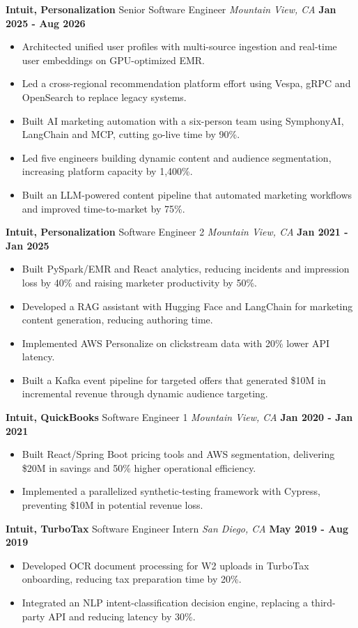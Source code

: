 \documentclass[10pt, letterpaper]{article}
\newcommand{\jobentry}[4]{
  \noindent\textbf{#1} \hfill #2 \hfill \textit{#3} \hfill \textbf{#4}
}
\begin{document}
\jobentry{Intuit, Personalization}{Senior Software Engineer}{Mountain View, CA}{Jan 2025 - Aug 2026}
\begin{itemize}
	\item Architected unified user profiles with multi-source ingestion and real-time user embeddings on GPU-optimized EMR.
	\item Led a cross-regional recommendation platform effort using Vespa, gRPC and OpenSearch to replace legacy systems.
	\item Built AI marketing automation with a six-person team using SymphonyAI, LangChain and MCP, cutting go-live time by 90\%.
	\item Led five engineers building dynamic content and audience segmentation, increasing platform capacity by 1,400\%.
	\item Built an LLM-powered content pipeline that automated marketing workflows and improved time-to-market by 75\%.
\end{itemize}

\jobentry{Intuit, Personalization}{Software Engineer 2}{Mountain View, CA}{Jan 2021 - Jan 2025}
\begin{itemize}
	\item Built PySpark/EMR and React analytics, reducing incidents and impression loss by 40\% and raising marketer productivity by 50\%.
	\item Developed a RAG assistant with Hugging Face and LangChain for marketing content generation, reducing authoring time.
	\item Implemented AWS Personalize on clickstream data with 20\% lower API latency.
	\item Built a Kafka event pipeline for targeted offers that generated \$10M in incremental revenue through dynamic audience targeting.
\end{itemize}

\jobentry{Intuit, QuickBooks}{Software Engineer 1}{Mountain View, CA}{Jan 2020 - Jan 2021}
\begin{itemize}
	\item Built React/Spring Boot pricing tools and AWS segmentation, delivering \$20M in savings and 50\% higher operational efficiency.
	\item Implemented a parallelized synthetic-testing framework with Cypress, preventing \$10M in potential revenue loss.
\end{itemize}

\jobentry{Intuit, TurboTax}{Software Engineer Intern}{San Diego, CA}{May 2019 - Aug 2019}
\begin{itemize}
	\item Developed OCR document processing for W2 uploads in TurboTax onboarding, reducing tax preparation time by 20\%.
	\item Integrated an NLP intent-classification decision engine, replacing a third-party API and reducing latency by 30\%.
\end{itemize}
\end{document}
